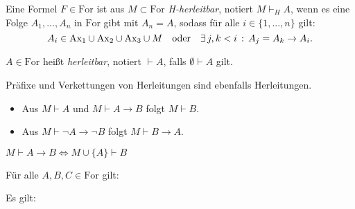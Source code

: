 \documentclass{cheat-sheet}
\newcommand{\For}{\mathrm{For}} %
\newcommand{\Ax}{\mathrm{Ax}} %
\begin{document}
\begin{defn}
  Eine Formel $F \in \For$ ist aus $M \subset \For$ \emph{H-herleitbar}, notiert $M \vdash_H A$, wenn es eine Folge $A_1, ..., A_n$ in $\For$ gibt mit $A_n = A$, sodass für alle $i \in \{ 1, ..., n \}$ gilt:
  \[
    A_i \in \Ax_1 \cup \Ax_2 \cup \Ax_3 \cup M
    \quad \text{oder} \quad
    \ex{j, k < i} A_j = A_k \to A_i.
  \]
\end{defn}

\begin{defn}
  $A \in \For$ heißt \emph{herleitbar}, notiert $\vdash A$, falls $\emptyset \vdash A$ gilt.
\end{defn}

\begin{beob}
  Präfixe und Verkettungen von Herleitungen sind ebenfalls Herleitungen.
\end{beob}

\begin{prop}
  \begin{itemize}
    \item Aus $M \vdash A$ und $M \vdash A \to B$ folgt $M \vdash B$.
    \item Aus $M \vdash \neg A \to \neg B$ folgt $M \vdash B \to A$.
  \end{itemize}
\end{prop}

\begin{satz}[Deduktionstheorem]
  $M \vdash A \to B \iff M \cup \{ A \} \vdash B$
\end{satz}

\begin{satz}
  Für alle $A, B, C \in \For$ gilt:
  \begin{itemize}
  \end{itemize}
\end{satz}

\begin{prop}
  Es gilt:
  
  \begin{center}
    \begin{minipage}{0.4\linewidth}
      \begin{prooftree}
      \end{prooftree}
    \end{minipage}
    \begin{minipage}{0.15\linewidth}
      \begin{prooftree}
      \end{prooftree}
    \end{minipage}
  \end{center}
\end{prop}
\end{document}
